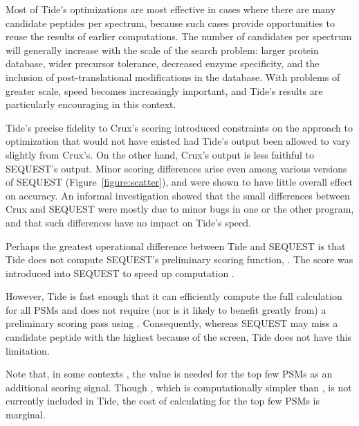 Most of Tide's optimizations are most effective in cases where there
are many candidate peptides per spectrum, because such cases provide
opportunities to reuse the results of earlier computations. The number
of candidates per spectrum will generally increase with the scale of
the search problem: larger protein database, wider
precursor tolerance, decreased enzyme specificity, and the inclusion
of post-translational modifications in the database. With
problems of greater scale, speed becomes increasingly important,
and Tide's results are particularly encouraging in this context.


Tide's precise fidelity to Crux's scoring introduced constraints on
the approach to optimization that would not have existed had Tide's
output been allowed to vary slightly from Crux's. On the other hand,
Crux's output is less faithful to SEQUEST's output. Minor scoring
differences arise even among various versions of SEQUEST
(Figure~\ref{figure:scatter}), and were shown \cite{park:rapid} to
have little overall effect on accuracy. An informal investigation
showed that the small differences between Crux and SEQUEST were mostly
due to minor bugs in one or the other program, and that such
differences have no impact on Tide's speed.

Perhaps the greatest operational difference between Tide and SEQUEST
is that Tide does not compute SEQUEST's preliminary scoring function,
\Sp. The \Sp score was introduced into SEQUEST to speed up computation
\cite{eng:approach}.

However, Tide is fast enough that it can efficiently compute the full
\XCorr calculation for all PSMs and does not require (nor is it likely
to benefit greatly from) a preliminary scoring pass using \Sp.
Consequently, whereas SEQUEST may miss a candidate peptide with the
highest \XCorr because of the \Sp screen, Tide does not have this
limitation.

Note that, in some contexts \cite{anderson:new, keller:empirical,
kall:semi-supervised}, the \Sp value is needed for the top few PSMs as
an additional scoring signal. Though \Sp, which is computationally
simpler than \XCorr, is not currently included in Tide, the cost of
calculating \Sp for the top few PSMs is marginal.

